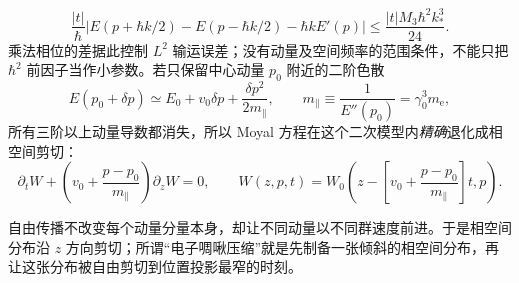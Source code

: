 \[
\frac{|t|}{\hbar}\left|E(p+\hbar k/2)-E(p-\hbar k/2)-\hbar kE'(p)\right|
\le\frac{|t|M_3\hbar^2k_*^3}{24}.
\]
乘法相位的差据此控制 $L^2$ 输运误差；没有动量及空间频率的范围条件，不能只把 $\hbar^2$ 前因子当作小参数。若只保留中心动量 $p_0$ 附近的二阶色散
\[
E(p_0+\delta p)
\simeq E_0+v_0\delta p+\frac{\delta p^2}{2m_\parallel},
\qquad
m_\parallel\equiv\frac{1}{E''(p_0)}=\gamma_0^3m_{\mathrm e},
\]
所有三阶以上动量导数都消失，所以 Moyal 方程在这个二次模型内\emph{精确}退化成相空间剪切：
\begin{equation}
{
\partial_tW+
\left(v_0+\frac{p-p_0}{m_\parallel}\right)\partial_zW=0,
\qquad
W(z,p,t)=
W_0\!\left(z-\left[v_0+\frac{p-p_0}{m_\parallel}\right]t,p\right).}
\label{eq:wigner_shear}
\end{equation}

自由传播不改变每个动量分量本身，却让不同动量以不同群速度前进。于是相空间分布沿 $z$ 方向剪切；所谓“电子啁啾压缩”就是先制备一张倾斜的相空间分布，再让这张分布被自由剪切到位置投影最窄的时刻。


